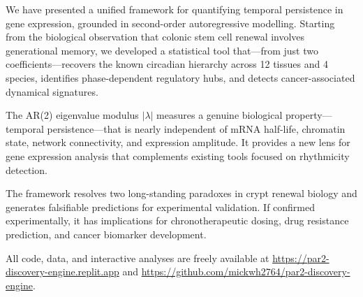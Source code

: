 \documentclass[11pt,letterpaper]{article}
\begin{document}
We have presented a unified framework for quantifying temporal persistence in gene expression, grounded in second-order autoregressive modelling. Starting from the biological observation that colonic stem cell renewal involves generational memory, we developed a statistical tool that---from just two coefficients---recovers the known circadian hierarchy across 12 tissues and 4 species, identifies phase-dependent regulatory hubs, and detects cancer-associated dynamical signatures.

The AR(2) eigenvalue modulus $|\lambda|$ measures a genuine biological property---temporal persistence---that is nearly independent of mRNA half-life, chromatin state, network connectivity, and expression amplitude. It provides a new lens for gene expression analysis that complements existing tools focused on rhythmicity detection.

The framework resolves two long-standing paradoxes in crypt renewal biology and generates falsifiable predictions for experimental validation. If confirmed experimentally, it has implications for chronotherapeutic dosing, drug resistance prediction, and cancer biomarker development.

All code, data, and interactive analyses are freely available at \url{https://par2-discovery-engine.replit.app} and \url{https://github.com/mickwh2764/par2-discovery-engine}.



\end{document}
